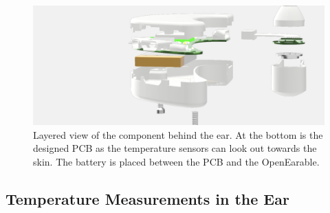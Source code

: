 \begin{figure}
    \centering
    \includegraphics[width=\textwidth]{thesis-doc/images/prototype/Prototype_PCB_layered_view.png}
    \caption{Layered view of the component behind the ear. At the bottom is the designed PCB as the temperature sensors can look out towards the skin. The battery is placed between the PCB and the OpenEarable.}
    \label{fig:design:prototype_behind_head_layered_view}
\end{figure}

\subsection{Temperature Measurements in the Ear}
\label{ch:Design:Prototype:Earpiece}

